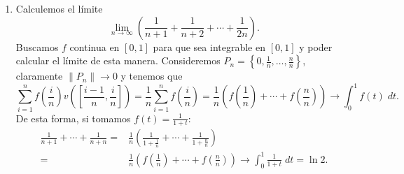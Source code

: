 \begin{eg}
\begin{enumerate}
	\[\int _{\left[0,1\right] ^{2}}f =\lim_{n \to \infty}\sum^{n}_{i = 1}\sum^{n}_{j=1}f\left(\frac{i}{n}, \frac{j}{n}\right)v\left(R_{ij}\right) ,\]
	cogiendo los $\displaystyle R_{ij} $ como en el ejemplo anterior.
\item Calculemos el límite
	\[\lim_{n \to \infty}\left(\frac{1}{n+1} + \frac{1}{n+2} + \cdots + \frac{1}{2n}\right) .\]
	Buscamos $\displaystyle f $ continua en $\displaystyle \left[0,1\right]  $ para que sea integrable en $\displaystyle \left[0,1\right]  $ y poder calcular el límite de esta manera. Consideremos $\displaystyle P_{n}= \left\{ 0, \frac{1}{n}, \ldots, \frac{n}{n}\right\}  $, claramente $\displaystyle \|P_{n}\| \to 0 $ y tenemos que 
	\[\sum^{n}_{i = 1}f\left(\frac{i}{n}\right)v\left(\left[\frac{i-1}{n}, \frac{i}{n}\right] \right)=\frac{1}{n}\sum^{n}_{i = 1}f\left(\frac{i}{n}\right)=\frac{1}{n}\left(f\left(\frac{1}{n}\right)+\cdots + f\left(\frac{n}{n}\right) \right)\to \int^{1}_{0} f\left(t\right) \; dt .\]
De esta forma, si tomamos $\displaystyle f\left(t\right)=\frac{1}{1 + t} $:
\[
\begin{split}
	\frac{1}{n+1}+\cdots + \frac{1}{n + n} =& \frac{1}{n}\left(\frac{1}{1+\frac{1}{n}}+ \cdots + \frac{1}{1+\frac{n}{n}}\right) \\
= & \frac{1}{n}\left(f\left(\frac{1}{n}\right)+\cdots + f\left(\frac{n}{n}\right)\right) \to \int^{1}_{0} \frac{1}{1 + t} \; dt = \ln 2.
\end{split}
\]

\end{enumerate}

\end{eg}

